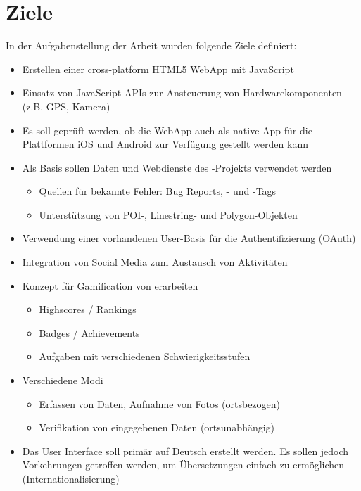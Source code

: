 \section{Ziele}
In der Aufgabenstellung der Arbeit wurden folgende Ziele definiert:
\begin{itemize}
	\item Erstellen einer cross-platform HTML5 \gls{WebApp} mit JavaScript
	\item Einsatz von JavaScript-\glspl{API} zur Ansteuerung von Hardwarekomponenten (z.B. GPS, Kamera)
	\item Es soll geprüft werden, ob die \gls{WebApp} auch als native App für die Plattformen iOS und Android zur Verfügung gestellt werden kann 
	\item Als Basis sollen Daten und Webdienste des -Projekts verwendet werden
	\begin{itemize}
		\item Quellen für bekannte Fehler:  Bug Reports, - und -\glspl{Tag}
		\item Unterstützung von \gls{POI}-, Linestring- und Polygon-Objekten
	\end{itemize}
	\item Verwendung einer vorhandenen User-Basis für die Authentifizierung (\gls{OAuth})
	\item Integration von Social Media zum Austausch von Aktivitäten
	\item Konzept für Gamification von  erarbeiten
	\begin{itemize}
		\item Highscores / Rankings
		\item Badges / Achievements
		\item Aufgaben mit verschiedenen Schwierigkeitsstufen
	\end{itemize}
	\item Verschiedene Modi
	\begin{itemize}
		\item Erfassen von Daten, Aufnahme von Fotos (ortsbezogen)
		\item Verifikation von eingegebenen Daten (ortsunabhängig)
	\end{itemize}
	\item Das User Interface soll primär auf Deutsch erstellt werden. Es sollen jedoch Vorkehrungen getroffen werden, um Übersetzungen einfach zu ermöglichen (Internationalisierung)
\end{itemize}

